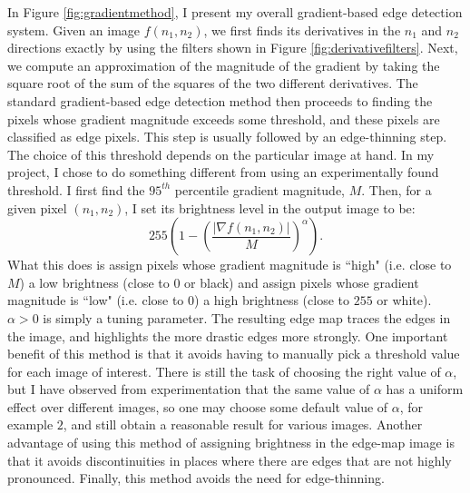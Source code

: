 \documentclass[12pt]{amsart}
\begin{document}
In Figure \ref{fig:gradientmethod}, I present my overall gradient-based edge detection system. Given an image $f(n_1, n_2)$, we first finds its derivatives in the $n_1$ and $n_2$ directions exactly by using the filters shown in Figure \ref{fig:derivativefilters}. Next, we compute an approximation of the magnitude of the gradient by taking the square root of the sum of the squares of the two different derivatives. The standard gradient-based edge detection method then proceeds to finding the pixels whose gradient magnitude exceeds some threshold, and these pixels are classified as edge pixels. This step is usually followed by an edge-thinning step. The choice of this threshold depends on the particular image at hand. In my project, I chose to do something different from using an experimentally found threshold. I first find the $95^{th}$ percentile gradient magnitude, $M$. Then, for a given pixel $(n_1, n_2)$, I set its brightness level in the output image to be:
\begin{equation*}
255 \left(1 - \left(\frac{|\nabla f(n_1, n_2)|}{M}\right)^\alpha\right).
\end{equation*}
What this does is assign pixels whose gradient magnitude is ``high" (i.e. close to $M$) a low brightness (close to $0$ or black) and assign pixels whose gradient magnitude is ``low" (i.e. close to $0$) a high brightness (close to $255$ or white). $\alpha > 0$ is simply a tuning parameter. The resulting edge map traces the edges in the image, and highlights the more drastic edges more strongly. One important benefit of this method is that it avoids having to manually pick a threshold value for each image of interest. There is still the task of choosing the right value of $\alpha$, but I have observed from experimentation that the same value of $\alpha$ has a uniform effect over different images, so one may choose some default value of $\alpha$, for example $2$, and still obtain a reasonable result for various images. Another advantage of using this method of assigning brightness in the edge-map image is that it avoids discontinuities in places where there are edges that are not highly pronounced. Finally, this method avoids the need for edge-thinning.
\end{document}
